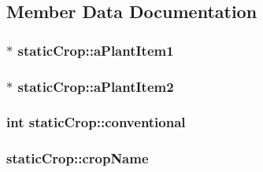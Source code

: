 \subsection{Member Data Documentation}
\hypertarget{classstatic_crop_ae7226eaa52819aa9c2d663a6cd7b86d2}{
\subsubsection[{aPlantItem1}]{$\ast$ {\bf staticCrop::aPlantItem1}}}
\label{classstatic_crop_ae7226eaa52819aa9c2d663a6cd7b86d2}
\hypertarget{classstatic_crop_ac802684f900defee8a00dff8e907127e}{
\subsubsection[{aPlantItem2}]{$\ast$ {\bf staticCrop::aPlantItem2}}}
\label{classstatic_crop_ac802684f900defee8a00dff8e907127e}
\hypertarget{classstatic_crop_ae8459ed32ec510851565bdbe4ed8e286}{
\subsubsection[{conventional}]{\setlength{\rightskip}{0pt plus 5cm}int {\bf staticCrop::conventional}}}
\label{classstatic_crop_ae8459ed32ec510851565bdbe4ed8e286}
\hypertarget{classstatic_crop_a75caaff99a291829f060f468a9f141d5}{
\subsubsection[{cropName}]{ {\bf staticCrop::cropName}}}
\label{classstatic_crop_a75caaff99a291829f060f468a9f141d5}
